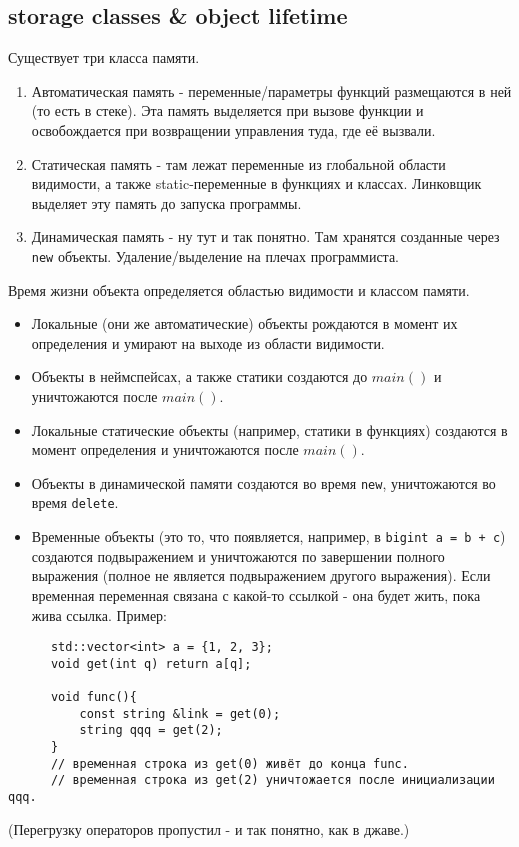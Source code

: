 \documentclass[15pt, a4paper]{article}
\newcommand{\nl}{\newline}
\begin{document}
  \subsection{storage classes \& object lifetime}
  Существует три класса памяти.
  \begin{enumerate}
      \item Автоматическая память - переменные/параметры функций размещаются в ней (то есть в стеке). Эта память
      выделяется при вызове функции и освобождается при возвращении управления туда, где её вызвали.
      \item Статическая память - там лежат переменные из глобальной области видимости, а также static-переменные в функциях и классах. Линковщик выделяет эту память до запуска программы.
      \item Динамическая память - ну тут и так понятно. Там хранятся созданные через \texttt{new} объекты. Удаление/выделение на плечах программиста.
  \end{enumerate}
  Время жизни объекта определяется областью видимости и классом памяти. 
  \begin{itemize}
      \item Локальные (они же автоматические) объекты рождаются в момент их определения и умирают на выходе из области видимости.
      \item Объекты в неймспейсах, а также статики создаются до $main()$ и уничтожаются после $main()$.
      \item Локальные статические объекты (например, статики в функциях) создаются в момент определения и уничтожаются после $main()$.
      \item Объекты в динамической памяти создаются во время \texttt{new}, уничтожаются во время \texttt{delete}.
      \item Временные объекты (это то, что появляется, например, в \texttt{bigint a = b + c}) создаются подвыражением и уничтожаются по завершении полного выражения (полное не является подвыражением другого выражения).
      Если временная переменная связана с какой-то ссылкой - она будет жить, пока жива ссылка. Пример:
  \end{itemize}
  \begin{verbatim}
      std::vector<int> a = {1, 2, 3};
      void get(int q) return a[q];

      void func(){
          const string &link = get(0);
          string qqq = get(2);
      }
      // временная строка из get(0) живёт до конца func.
      // временная строка из get(2) уничтожается после инициализации qqq.
  \end{verbatim}
  (Перегрузку операторов пропустил - и так понятно, как в джаве.) \nl
\end{document}
